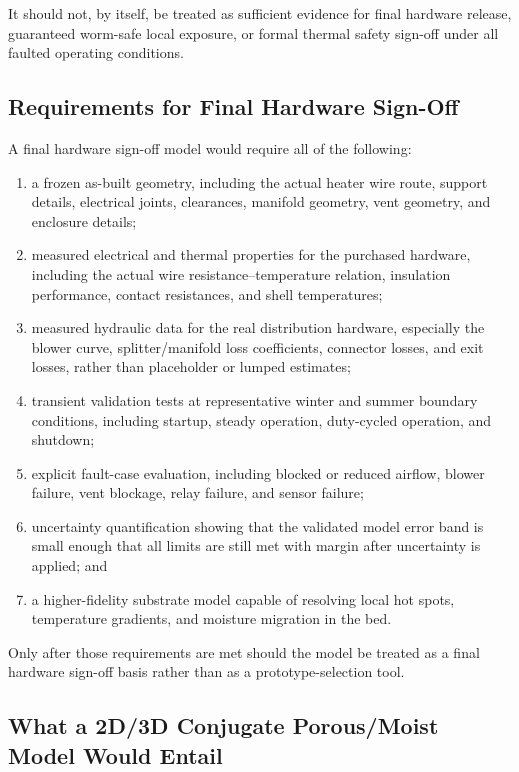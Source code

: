 \documentclass{article}
\begin{document}
It should not, by itself, be treated as sufficient evidence for final
hardware release, guaranteed worm-safe local exposure, or formal thermal
safety sign-off under all faulted operating conditions.

\subsection{Requirements for Final Hardware Sign-Off}

A final hardware sign-off model would require all of the following:
\begin{enumerate}
\item a frozen as-built geometry, including the actual heater wire route,
support details, electrical joints, clearances, manifold geometry, vent
geometry, and enclosure details;
\item measured electrical and thermal properties for the purchased hardware,
including the actual wire resistance--temperature relation, insulation
performance, contact resistances, and shell temperatures;
\item measured hydraulic data for the real distribution hardware, especially
the blower curve, splitter/manifold loss coefficients, connector losses, and
exit losses, rather than placeholder or lumped estimates;
\item transient validation tests at representative winter and summer boundary
conditions, including startup, steady operation, duty-cycled operation, and
shutdown;
\item explicit fault-case evaluation, including blocked or reduced airflow,
blower failure, vent blockage, relay failure, and sensor failure;
\item uncertainty quantification showing that the validated model error band is
small enough that all limits are still met with margin after uncertainty is
applied; and
\item a higher-fidelity substrate model capable of resolving local hot spots,
temperature gradients, and moisture migration in the bed.
\end{enumerate}

Only after those requirements are met should the model be treated as a final
hardware sign-off basis rather than as a prototype-selection tool.

\subsection{What a 2D/3D Conjugate Porous/Moist Model Would Entail}
\end{document}
